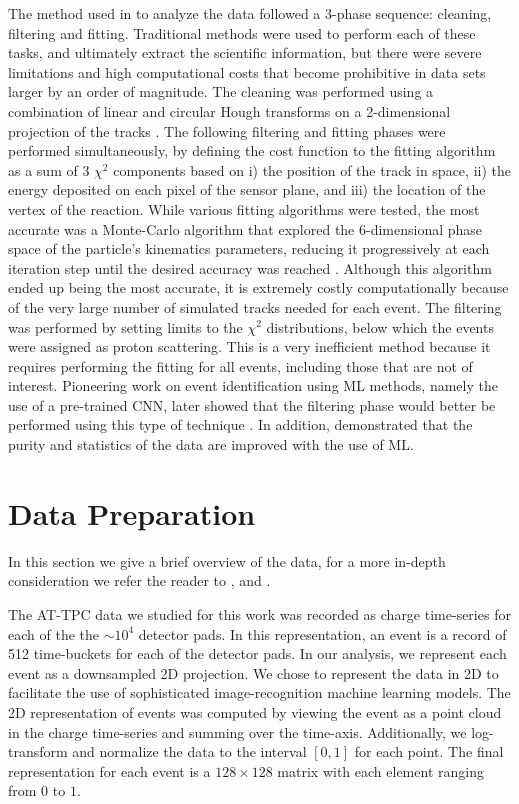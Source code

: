 \documentclass[review,number,sort&compress]{elsarticle}
\begin{document}
The method used in \cite{Bradt2018} to analyze the data followed a 3-phase sequence: cleaning, filtering and fitting. Traditional methods were used to perform each of these tasks, and ultimately extract the scientific information, but there were severe limitations and high computational costs that become prohibitive in data sets larger by an order of magnitude. 
The cleaning was performed using a combination of linear and circular Hough transforms on a 2-dimensional projection of the tracks \cite{Bradt2017}. The following filtering and fitting phases were performed simultaneously, by defining the cost function to the fitting algorithm as a sum of 3 $\chi^2$ components based on i) the position of the track in space, ii) the energy deposited on each pixel of the sensor plane, and iii) the location of the vertex of the reaction. While various fitting algorithms were tested, the most accurate was a Monte-Carlo algorithm that explored the 6-dimensional phase space of the particle's kinematics parameters, reducing it progressively at each iteration step until the desired accuracy was reached \cite{Bradt2017}. Although this algorithm ended up being the most accurate, it is extremely costly computationally because of the very large number of simulated tracks needed for each event. The filtering was performed by setting limits to the $\chi^2$ distributions, below which the events were assigned as proton scattering. This is a very inefficient method because it requires performing the fitting for all events, including those that are not of interest. Pioneering work on event identification using ML methods, namely the use of a pre-trained CNN, later showed that the filtering phase would better be performed using this type of technique \cite{Kuchera2019}. 
In addition, \cite{Kuchera2019} demonstrated that the purity and statistics of the data are improved with the use of ML.


\section{Data Preparation}

In this section we give a brief overview of the data, for a more in-depth consideration we refer the reader to \cite{Mittig2015}, \cite{Suzuki2012} and  \cite{Bradt2017a}. 

The AT-TPC data we studied for this work was recorded as charge time-series for each of the  the $\sim10^4$ detector pads.
In this representation, an event is a record of 512 time-buckets for each of the detector pads. In our analysis, we represent each event as a downsampled 2D projection.
We chose to represent the data in 2D to facilitate the use of sophisticated image-recognition machine learning models.
The 2D representation of events was computed by viewing the event as a point cloud in the charge time-series and summing over the time-axis.
Additionally, we log-transform and normalize the data to the interval $[0, 1]$ for each point. The final representation for each event is a $128 \times 128$ matrix with each element ranging from $0$ to $1$.
\end{document}
